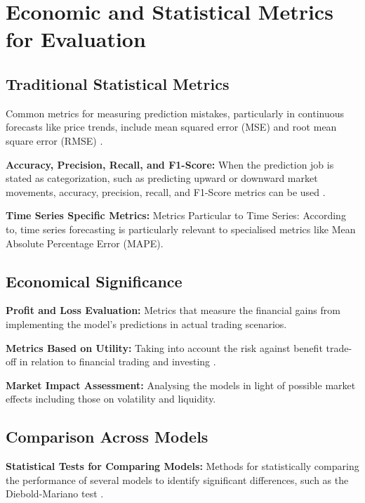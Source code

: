 \goodbreak
\section{Economic and Statistical Metrics for Evaluation}
\smallskip

\subsection{Traditional Statistical Metrics}
\smallskip

Common metrics for measuring prediction mistakes, particularly in continuous forecasts like price trends, include mean squared error (MSE) and root mean square error (RMSE) \citep{hyndman_another_2006}.

\textbf{Accuracy, Precision, Recall, and F1-Score:} When the prediction job is stated as categorization, such as predicting upward or downward market movements, accuracy, precision, recall, and F1-Score metrics can be used \citep{DBLP:journals/ipm/SokolovaL09}.

\textbf{Time Series Specific Metrics:} Metrics Particular to Time Series: According to\citep{9f5faea9a4884eff9665c32105db424f}, time series forecasting is particularly relevant to specialised metrics like Mean Absolute Percentage Error (MAPE).

\subsection{Economical Significance}
\smallskip

\textbf{Profit and Loss Evaluation:} Metrics that measure the financial gains from implementing the model's predictions in actual trading scenarios.

\textbf{Metrics Based on Utility:} 
Taking into account the risk against benefit trade-off in relation to financial trading and investing \citep{danielsson_model_2016}.

\textbf{Market Impact Assessment:} Analysing the models in light of possible market effects including those on volatility and liquidity.

\subsection{Comparison Across Models}
\smallskip

\textbf{Statistical Tests for Comparing Models:} Methods for statistically comparing the performance of several models to identify significant differences, such as the Diebold-Mariano test \citep{doi:10.1080/07350015.1995.10524599}.


